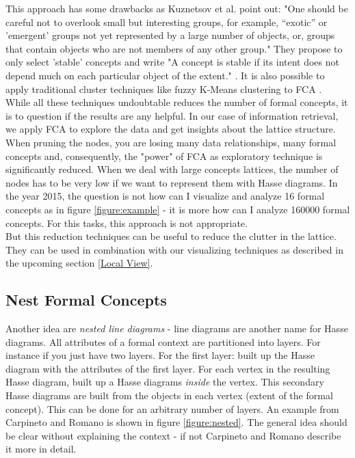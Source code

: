 \documentclass[11pt]{report}
\begin{document}
 This approach has some drawbacks as Kuznetsov et al. \cite{Kuznetsov20072} point out: "One should be careful not to overlook small but interesting groups, for example, “exotic” or 'emergent' groups not yet represented by a large number of objects, or, groups that contain objects who are not members of any other group." They propose to only select 'stable' concepts and write "A concept is stable if its intent does not depend much on each particular object of the extent." \cite{Kuznetsov20072}. It is also possible to apply traditional cluster techniques like fuzzy K-Means clustering to FCA \cite{AswaniKumar2010}. \\

	While all these techniques undoubtable reduces the number of formal concepts, it is to question if the results are any helpful. In our case of information retrieval, we apply FCA to explore the data and get insights about the lattice structure. When pruning the nodes, you are losing many data relationships, many formal concepts and, consequently, the "power" of FCA as exploratory technique is significantly reduced. When we deal with large concepts lattices, the number of nodes has to be very low if we want to represent them with Hasse diagrams. In the year 2015, the question is not how can I visualize and analyze 16 formal concepts as in figure \ref{figure:example} - it is more how can I analyze 160000 formal concepts. For this tasks, this approach is not appropriate. \\
	
	But this reduction techniques can be useful to reduce the clutter in the lattice. They can be used in combination with our visualizing techniques as described in the upcoming section \ref{Local View}. \\
	
\subsection{Nest Formal Concepts}	

Another idea are \textit{nested line diagrams} - line diagrams are another name for Hasse diagrams. All attributes of a formal context are partitioned into layers. For instance if you just have two layers. For the first layer: built up the Hasse diagram with the attributes of the first layer. For each vertex in the resulting Hasse diagram, built up a Hasse diagrams \textit{inside} the vertex. This secondary Hasse diagrams are built from the objects in each vertex (extent of the formal concept). This can be done for an arbitrary number of layers. An example from Carpineto and Romano \cite{carpineto2004concept} is shown in figure \ref{figure:nested}. The general idea should be clear without explaining the context - if not Carpineto and Romano \cite{carpineto2004concept} describe it more in detail. \\
\end{document}
